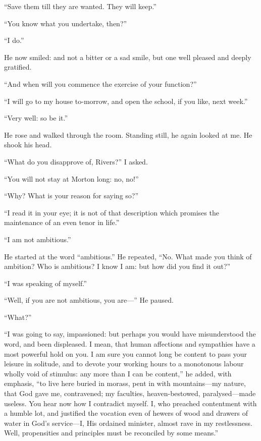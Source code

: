 \enquote{Save them till they are wanted. They will keep.}

\enquote{You know what you undertake, then?}

\enquote{I do.}

He now smiled: and not a bitter or a sad smile, but one well pleased and
deeply gratified.

\enquote{And when will you commence the exercise of your function?}

\enquote{I will go to my house to-morrow, and open the school, if you
like, next week.}

\enquote{Very well: so be it.}

He rose and walked through the room. Standing still, he again looked at
me. He shook his head.

\enquote{What do you disapprove of, \Mr{} Rivers?} I asked.

\enquote{You will not stay at Morton long: no, no!}

\enquote{Why? What is your reason for saying so?}

\enquote{I read it in your eye; it is not of that description which
promises the maintenance of an even tenor in life.}

\enquote{I am not ambitious.}

He started at the word \enquote{ambitious.} He repeated, \enquote{No. 
What made you think of ambition? Who is ambitious? I know I am: but
how did you find it out?}

\enquote{I was speaking of myself.}

\enquote{Well, if you are not ambitious, you are---} He paused.

\enquote{What?}

\enquote{I was going to say, impassioned: but perhaps you would have
misunderstood the word, and been displeased. I mean, that human
affections and sympathies have a most powerful hold on you. I am sure
you cannot long be content to pass your leisure in solitude, and to
devote your working hours to a monotonous labour wholly void of
stimulus: any more than I can be content,} he added, with emphasis,
\enquote{to live here buried in morass, pent in with mountains---my
nature, that God gave me, contravened; my faculties, heaven-bestowed,
paralysed---made useless. You hear now how I contradict myself. I, who
preached contentment with a humble lot, and justified the vocation even
of hewers of wood and drawers of water in God's service---I, His
ordained minister, almost rave in my restlessness. Well, propensities
and principles must be reconciled by some means.}

